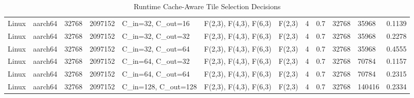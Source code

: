 \begin{table}[t]
\begin{tabular}{llllllllllll}
   Linux &    aarch64 &       32768 &    2097152 &    C\_in=32, C\_out=16 &  F(2,3), F(4,3), F(6,3) &         F(2,3) &                  4 &   0.7 &          32768 &                           35968 &       0.1139 \\
   Linux &    aarch64 &       32768 &    2097152 &    C\_in=32, C\_out=32 &  F(2,3), F(4,3), F(6,3) &         F(2,3) &                  4 &   0.7 &          32768 &                           35968 &       0.2278 \\
   Linux &    aarch64 &       32768 &    2097152 &    C\_in=32, C\_out=64 &  F(2,3), F(4,3), F(6,3) &         F(2,3) &                  4 &   0.7 &          32768 &                           35968 &       0.4555 \\
   Linux &    aarch64 &       32768 &    2097152 &    C\_in=64, C\_out=32 &  F(2,3), F(4,3), F(6,3) &         F(2,3) &                  4 &   0.7 &          32768 &                           70784 &       0.1157 \\
   Linux &    aarch64 &       32768 &    2097152 &    C\_in=64, C\_out=64 &  F(2,3), F(4,3), F(6,3) &         F(2,3) &                  4 &   0.7 &          32768 &                           70784 &       0.2315 \\
   Linux &    aarch64 &       32768 &    2097152 &  C\_in=128, C\_out=128 &  F(2,3), F(4,3), F(6,3) &         F(2,3) &                  4 &   0.7 &          32768 &                          140416 &       0.2334 \\
\bottomrule
\end{tabular}
\caption{Runtime Cache-Aware Tile Selection Decisions}
\end{table}
